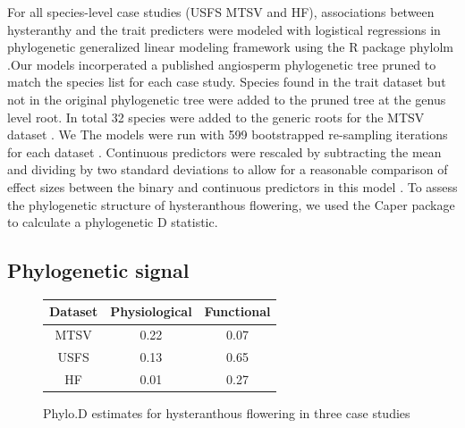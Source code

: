 \documentclass[12pt]{article}\usepackage[]{graphicx}\usepackage[]{color}
\begin{document}
\indent For all species-level case studies (USFS MTSV and HF), associations between hysteranthy and the trait predicters were modeled with logistical regressions in phylogenetic generalized linear modeling framework \citep{Ives2010} using the R package phylolm \citep{Ho2014}.Our models incorperated a published angiosperm phylogenetic tree \citep{Zanne2013} pruned to match the species list for each case study. Species found in the trait dataset but not in the original phylogenetic tree were added to the pruned tree at the genus level root. In total 32 species were added to the generic roots for the MTSV dataset . We The models were run with 599 bootstrapped re-sampling iterations for each dataset \citep{Wilcox2000}. Continuous predictors were rescaled by subtracting the mean and dividing by two standard deviations to allow for a reasonable comparison of effect sizes between the binary and continuous predictors in this model \citep{Gelman2007}.  To assess the phylogenetic structure of hysteranthous flowering, we used the Caper package \citep{Orme2013} to calculate a phylogenetic D statistic.\\

\subsection*{Phylogenetic signal}
\begin{figure}[h!]
\begin{tabular}[width=\textwidth]{|c|c|c|}
\hline
Dataset&Physiological&Functional\\
\hline
MTSV&0.22&0.07\\
USFS&0.13&0.65\\
HF&0.01&0.27\\
\hline
\end{tabular}
\caption{Phylo.D estimates for hysteranthous flowering in three case studies}
\label{fig:Figure 7}
\end{figure}
\end{document}

